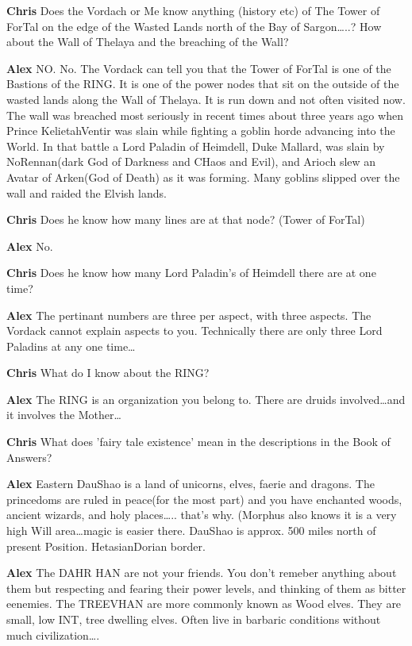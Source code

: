 {\bf Chris}
Does the Vordach or Me know anything (history etc) of	The Tower of ForTal 
on the edge of the Wasted Lands north of the Bay of Sargon\dots..?
How about the Wall of Thelaya and the breaching of the Wall?

{\bf Alex }
NO. No. The Vordack can tell you that the Tower of ForTal is one of the 
Bastions of the RING. It is one of the power nodes that sit on the 
outside of the wasted lands along the Wall of Thelaya. 
It is run down and not often visited now. The wall was breached most seriously 
in recent times about three years ago when 
Prince Keliet\-ah\-Ventir was slain while fighting a goblin horde advancing 
into the World. In that battle a Lord Paladin of Heimdell, Duke Mallard, 
was slain by No\-Rennan(dark God of Darkness and CHaos and Evil), 
and Arioch slew an Avatar of Arken(God of Death) as it was forming. 
Many goblins slipped over the wall and raided the Elvish lands.

{\bf Chris}
Does he know how many lines are at that node? (Tower of ForTal)

{\bf Alex }
No.

{\bf Chris}
Does he know how many Lord Paladin's of Heimdell there are at one time?

{\bf Alex }	
The pertinant numbers are three per aspect, with three aspects. The Vordack 
cannot explain aspects to you. Technically there are only three Lord Paladins 
at any one time\dots 

{\bf Chris}
What do I know about the RING?

{\bf Alex }	
The RING is an organization you belong to. There are druids involved\dots and 
it involves the Mother\dots 

{\bf Chris}
What does 'fairy tale existence' mean in the descriptions in the 
Book of Answers?

{\bf Alex }
Eastern Dau\-Shao is a land of unicorns, elves, faerie and dragons. The 
princedoms are ruled in peace(for the most part) and you have enchanted 
woods, ancient wizards, and holy places\dots.. that's why. 
(Morphus also knows it is a very high Will area\dots magic is easier 
there. Dau\-Shao is approx. 500 miles north of present 
Position. Hetasian\-Dorian border.

{\bf Alex }	
The DAHR HAN are not your friends. You don't remeber anything about them 
but respecting and fearing their power levels, and thinking of them as 
bitter eenemies. The TREEVHAN are more commonly known as Wood elves. They are 
small, low INT, tree dwelling elves. Often live in barbaric conditions without 
much civilization\dots.

